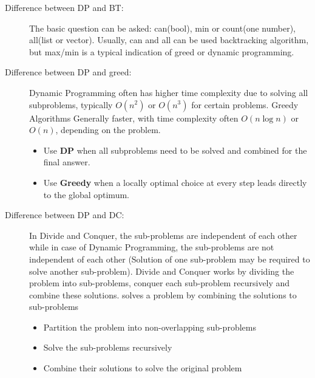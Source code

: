 \documentclass[a4paper,11pt,twoside]{book}
\begin{document}
	
%	
	
	
	
\begin{description}
	\item[Difference between DP and BT:] The basic question can be asked: can(bool), min or count(one number), all(list or vector). Usually, can and all can be used backtracking algorithm, but max/min is a typical indication of greed or dynamic programming.
	
	
	\item[Difference between DP and greed:] Dynamic Programming often has higher time complexity due to solving all subproblems, typically $O(n^2)$ or $O(n^3)$ for certain problems. Greedy Algorithms Generally faster, with time complexity often $O(n \log n)$ or $O(n)$, depending on the problem.

\begin{itemize}
	\item Use \textbf{DP} when all subproblems need to be solved and combined for the final answer.
	
	\item Use \textbf{Greedy} when a locally optimal choice at every step leads directly to the global optimum.
\end{itemize}
	
	
	\item[Difference between DP and DC:] In Divide and Conquer, the sub-problems are independent of each other while in case of Dynamic Programming, the sub-problems are not independent of each other (Solution of one sub-problem may be required to solve another sub-problem). Divide and Conquer works by dividing the problem into sub-problems, conquer each sub-problem recursively and combine these solutions. solves a problem by combining the solutions to sub-problems
	
	\begin{itemize}
		\item Partition the problem into non-overlapping sub-problems
		
		\item Solve the sub-problems recursively
		
		\item Combine their solutions to solve the original problem
	\end{itemize}
	
\end{description}
	
\end{document}
